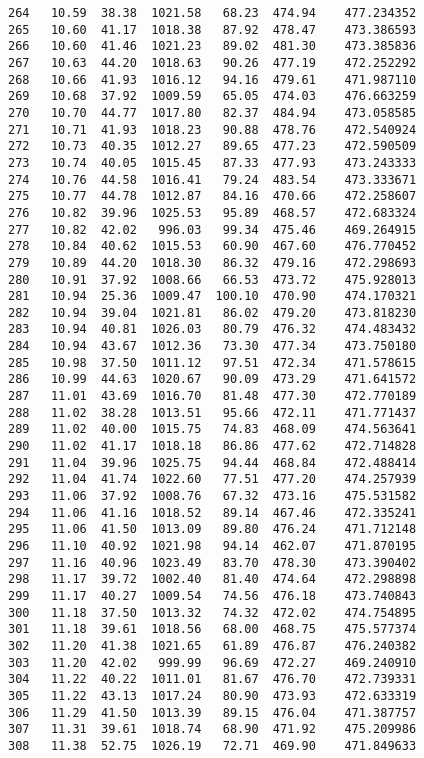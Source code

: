 \documentclass[11pt]{article}
\begin{document}
\begin{tcolorbox}[breakable, size=fbox, boxrule=.5pt, pad at break*=1mm, opacityfill=0]
\begin{Verbatim}[commandchars=\\\{\}]
264   10.59  38.38  1021.58   68.23  474.94    477.234352
265   10.60  41.17  1018.38   87.92  478.47    473.386593
266   10.60  41.46  1021.23   89.02  481.30    473.385836
267   10.63  44.20  1018.63   90.26  477.19    472.252292
268   10.66  41.93  1016.12   94.16  479.61    471.987110
269   10.68  37.92  1009.59   65.05  474.03    476.663259
270   10.70  44.77  1017.80   82.37  484.94    473.058585
271   10.71  41.93  1018.23   90.88  478.76    472.540924
272   10.73  40.35  1012.27   89.65  477.23    472.590509
273   10.74  40.05  1015.45   87.33  477.93    473.243333
274   10.76  44.58  1016.41   79.24  483.54    473.333671
275   10.77  44.78  1012.87   84.16  470.66    472.258607
276   10.82  39.96  1025.53   95.89  468.57    472.683324
277   10.82  42.02   996.03   99.34  475.46    469.264915
278   10.84  40.62  1015.53   60.90  467.60    476.770452
279   10.89  44.20  1018.30   86.32  479.16    472.298693
280   10.91  37.92  1008.66   66.53  473.72    475.928013
281   10.94  25.36  1009.47  100.10  470.90    474.170321
282   10.94  39.04  1021.81   86.02  479.20    473.818230
283   10.94  40.81  1026.03   80.79  476.32    474.483432
284   10.94  43.67  1012.36   73.30  477.34    473.750180
285   10.98  37.50  1011.12   97.51  472.34    471.578615
286   10.99  44.63  1020.67   90.09  473.29    471.641572
287   11.01  43.69  1016.70   81.48  477.30    472.770189
288   11.02  38.28  1013.51   95.66  472.11    471.771437
289   11.02  40.00  1015.75   74.83  468.09    474.563641
290   11.02  41.17  1018.18   86.86  477.62    472.714828
291   11.04  39.96  1025.75   94.44  468.84    472.488414
292   11.04  41.74  1022.60   77.51  477.20    474.257939
293   11.06  37.92  1008.76   67.32  473.16    475.531582
294   11.06  41.16  1018.52   89.14  467.46    472.335241
295   11.06  41.50  1013.09   89.80  476.24    471.712148
296   11.10  40.92  1021.98   94.14  462.07    471.870195
297   11.16  40.96  1023.49   83.70  478.30    473.390402
298   11.17  39.72  1002.40   81.40  474.64    472.298898
299   11.17  40.27  1009.54   74.56  476.18    473.740843
300   11.18  37.50  1013.32   74.32  472.02    474.754895
301   11.18  39.61  1018.56   68.00  468.75    475.577374
302   11.20  41.38  1021.65   61.89  476.87    476.240382
303   11.20  42.02   999.99   96.69  472.27    469.240910
304   11.22  40.22  1011.01   81.67  476.70    472.739331
305   11.22  43.13  1017.24   80.90  473.93    472.633319
306   11.29  41.50  1013.39   89.15  476.04    471.387757
307   11.31  39.61  1018.74   68.90  471.92    475.209986
308   11.38  52.75  1026.19   72.71  469.90    471.849633

\end{Verbatim}
\end{tcolorbox}
\end{document}
